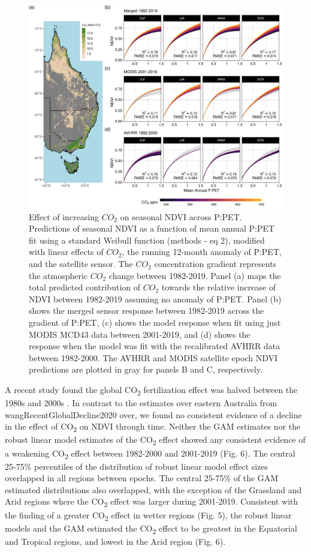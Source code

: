 \documentclass[gc, manuscript]{copernicus}
\begin{document}
\clearpage
\begin{figure}
\includegraphics[width=14cm]{../../figures/Fig5_n4_ndvi_map_weibull_ppet_x_co2_modeled_effect} \caption{Effect of increasing $CO_2$ on seasonal NDVI across P:PET. Predictions of seasonal NDVI as a function of mean annual P:PET fit using a standard Weibull function (methods - eq 2), modified with linear effects of $CO_2$, the running 12-month anomaly of P:PET, and the satellite sensor. The $CO_2$ concentration gradient represents the atmospheric $CO_2$ change between 1982-2019. Panel (a) maps the total predicted contribution of $CO_2$ towards the relative increase of NDVI between 1982-2019 assuming no anomaly of P:PET. Panel (b) shows the merged sensor response between 1982-2019 across the gradient of P:PET, (c) shows the model response when fit using just MODIS MCD43 data between 2001-2019, and (d) shows the response when the model was fit with the recalibrated AVHRR data between 1982-2000. The AVHRR and MODIS satellite epoch NDVI predictions are plotted in gray for panels B and C, respectively.}\label{fig:unnamed-chunk-4}
\end{figure}
\clearpage

A recent study found the global CO\textsubscript{2} fertilization effect
was halved between the 1980s and 2000s
\citep{wangRecentGlobalDecline2020}. In contrast to the estimates over
eastern Australia from wangRecentGlobalDecline2020 over, we found no
consistent evidence of a decline in the effect of CO\textsubscript{2} on
NDVI through time. Neither the GAM estimates nor the robust linear model
estimates of the CO\textsubscript{2} effect showed any consistent
evidence of a weakening CO\textsubscript{2} effect between 1982-2000 and
2001-2019 (Fig. 6). The central 25-75\% percentiles of the distribution
of robust linear model effect sizes overlapped in all regions between
epochs. The central 25-75\% of the GAM estimated distributions also
overlapped, with the exception of the Grassland and Arid regions where
the CO\textsubscript{2} effect was larger during 2001-2019. Consistent
with the finding of a greater CO\textsubscript{2} effect in wetter
regions (Fig. 5), the robust linear models and the GAM estimated the
CO\textsubscript{2} effect to be greatest in the Equatorial and Tropical
regions, and lowest in the Arid region (Fig. 6).
\end{document}

